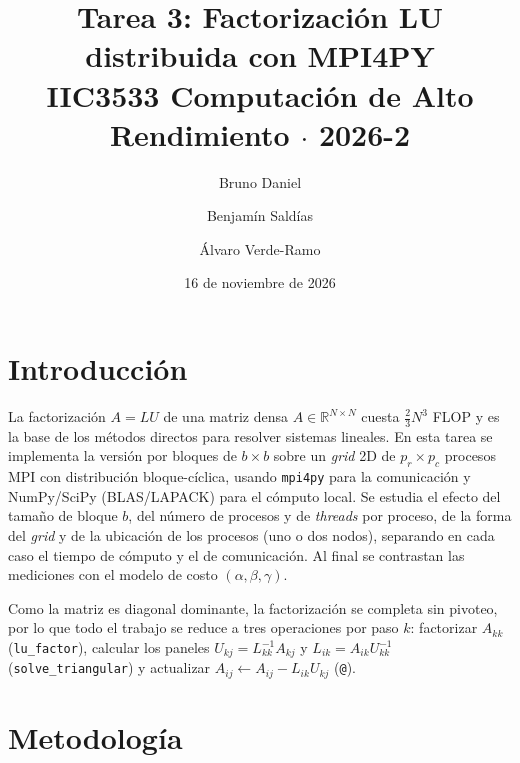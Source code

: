 \documentclass[11pt,a4paper]{article}
\title{Tarea 3: Factorización LU distribuida con MPI4PY\\
\large IIC3533 Computación de Alto Rendimiento $\cdot$ 2026-2}
\author{Bruno Daniel \and Benjamín Saldías \and Álvaro Verde-Ramo}
\date{16 de noviembre de 2026}
\begin{document}
\decimalpoint
\maketitle

\section{Introducción}
La factorización $A=LU$ de una matriz densa $A\in\mathbb{R}^{N\times N}$ cuesta $\tfrac{2}{3}N^3$ FLOP y es la base de los métodos directos para resolver sistemas lineales. En esta tarea se implementa la versión por bloques de $b\times b$ sobre un \emph{grid} 2D de $p_r\times p_c$ procesos MPI con distribución bloque-cíclica, usando \texttt{mpi4py} para la comunicación y NumPy/SciPy (BLAS/LAPACK) para el cómputo local. Se estudia el efecto del tamaño de bloque $b$, del número de procesos y de \emph{threads} por proceso, de la forma del \emph{grid} y de la ubicación de los procesos (uno o dos nodos), separando en cada caso el tiempo de cómputo y el de comunicación. Al final se contrastan las mediciones con el modelo de costo $(\alpha,\beta,\gamma)$.

Como la matriz es diagonal dominante, la factorización se completa sin pivoteo, por lo que todo el trabajo se reduce a tres operaciones por paso $k$: factorizar $A_{kk}$ (\texttt{lu\_factor}), calcular los paneles $U_{kj}=L_{kk}^{-1}A_{kj}$ y $L_{ik}=A_{ik}U_{kk}^{-1}$ (\texttt{solve\_triangular}) y actualizar $A_{ij}\leftarrow A_{ij}-L_{ik}U_{kj}$ (\texttt{@}).

\section{Metodología}
\end{document}
